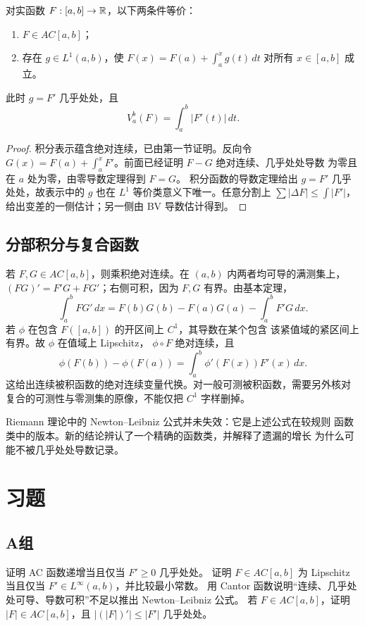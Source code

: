 \begin{theorem}\label{thm:lebesgue-ftc}
对实函数 \(F:[a,b]\to\mathbb{R}\)，以下两条件等价：
\begin{enumerate}
\item \(F\in AC[a,b]\)；
\item 存在 \(g\in L^1(a,b)\)，使 \(F(x)=F(a)+\int_a^xg(t)\,dt\) 对所有
\(x\in[a,b]\) 成立。
\end{enumerate}
此时 \(g=F'\) 几乎处处，且
\[
 V_a^b(F)=\int_a^b|F'(t)|\,dt.
\]
\end{theorem}
\begin{proof}
积分表示蕴含绝对连续，已由第一节证明。反向令
\(G(x)=F(a)+\int_a^xF'\)。前面已经证明 \(F-G\) 绝对连续、几乎处处导数
为零且在 \(a\) 处为零，由零导数定理得到 \(F=G\)。
积分函数的导数定理给出 \(g=F'\) 几乎处处，故表示中的 \(g\) 也在
\(L^1\) 等价类意义下唯一。任意分割上 \(\sum|\Delta F|\le\int|F'|\)，
给出变差的一侧估计；另一侧由 BV 导数估计得到。
\end{proof}

\subsection{分部积分与复合函数}

若 \(F,G\in AC[a,b]\)，则乘积绝对连续。在 \((a,b)\) 内两者均可导的满测集上，
\((FG)'=F'G+FG'\)；右侧可积，因为 \(F,G\) 有界。由基本定理，
\[
 \int_a^bF G'\,dx=F(b)G(b)-F(a)G(a)-\int_a^bF'G\,dx.
\]
若 \(\phi\) 在包含 \(F([a,b])\) 的开区间上 \(C^1\)，其导数在某个包含
该紧值域的紧区间上有界。故 \(\phi\) 在值域上 Lipschitz，
\(\phi\circ F\) 绝对连续，且
\[
 \phi(F(b))-\phi(F(a))=\int_a^b\phi'(F(x))F'(x)\,dx.
\]
这给出连续被积函数的绝对连续变量代换。对一般可测被积函数，需要另外核对
复合的可测性与零测集的原像，不能仅把 \(C^1\) 字样删掉。

Riemann 理论中的 Newton--Leibniz 公式并未失效：它是上述公式在较规则
函数类中的版本。新的结论辨认了一个精确的函数类，并解释了遗漏的增长
为什么可能不被几乎处处导数记录。

\section*{习题}
\subsection*{A组}
\begin{enumerate}[label=\textbf{\thechapter.\arabic*.}]
证明 AC 函数递增当且仅当 \(F'\ge0\) 几乎处处。
证明 \(F\in AC[a,b]\) 为 Lipschitz 当且仅当 \(F'\in L^\infty(a,b)\)，并比较最小常数。
用 Cantor 函数说明“连续、几乎处处可导、导数可积”不足以推出 Newton--Leibniz 公式。
若 \(F\in AC[a,b]\)，证明 \(|F|\in AC[a,b]\)，且 \(|(|F|)'|\le|F'|\) 几乎处处。
\end{enumerate}
